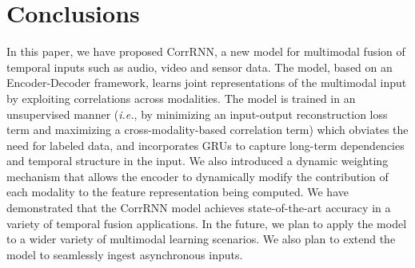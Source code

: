 \documentclass[10pt,twocolumn,letterpaper]{article}
\begin{document}
\section{Conclusions}
\label{sec:conclude}

In this paper, we have proposed CorrRNN, a new model for multimodal fusion of temporal inputs such as audio, video and sensor data. The model, based on an Encoder-Decoder framework, learns joint representations of the multimodal input by exploiting correlations across modalities. The model is trained in an unsupervised manner (\textit{i.e.}, by minimizing an input-output reconstruction loss term and maximizing a cross-modality-based correlation term) which obviates the need for labeled data, and incorporates GRUs to capture long-term dependencies and temporal structure in the input. We also introduced a dynamic weighting mechanism that allows the encoder to dynamically modify the contribution of each modality to the feature representation being computed.  We have demonstrated that the CorrRNN model achieves state-of-the-art accuracy in a variety of temporal fusion applications. In the future, we plan to apply the model to a wider variety of multimodal learning scenarios. We also plan to extend the model to seamlessly ingest asynchronous inputs.

 
\end{document}
